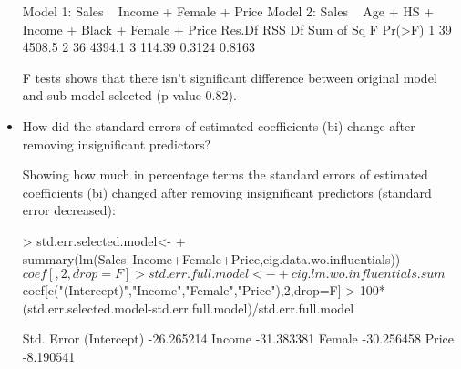 \documentclass[a4paper]{article}
\begin{document}
\begin{itemize}
\begin{Schunk}
\begin{Soutput}
Model 1: Sales ~ Income + Female + Price
Model 2: Sales ~ Age + HS + Income + Black + Female + Price
  Res.Df    RSS Df Sum of Sq      F Pr(>F)
1     39 4508.5                           
2     36 4394.1  3    114.39 0.3124 0.8163
\end{Soutput}
\end{Schunk}
F tests shows that there isn't significant difference between original model and
sub-model selected (p-value 0.82). 
\item How did the standard errors of estimated coefficients (bi) change after
removing insignificant predictors?

Showing how much in percentage terms the standard errors of estimated
coefficients (bi) changed after removing insignificant predictors
(standard error decreased):
\begin{Schunk}
\begin{Sinput}
> std.err.selected.model<-
+ 		summary(lm(Sales~Income+Female+Price,cig.data.wo.influentials))$coef[,2,drop=F]
> std.err.full.model<-
+ 		cig.lm.wo.influentials.sum$coef[c("(Intercept)","Income","Female","Price"),2,drop=F]
> 100*(std.err.selected.model-std.err.full.model)/std.err.full.model
\end{Sinput}
\begin{Soutput}
            Std. Error
(Intercept) -26.265214
Income      -31.383381
Female      -30.256458
Price        -8.190541
\end{Soutput}
\end{Schunk}
\end{itemize}
\end{document}

